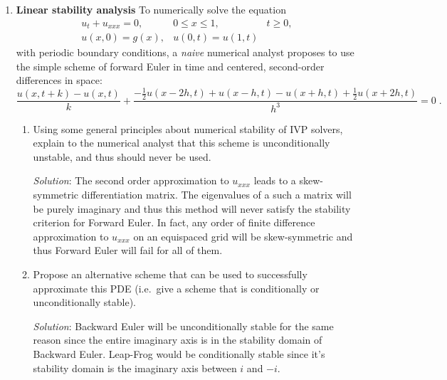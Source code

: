 \documentclass[final,oneside,onecolumn]{article}
\begin{document}
\begin{enumerate}
\item \textbf{Linear stability analysis} To numerically solve
the equation
\begin{equation*}
\begin{array}{lll}
u_t + u_{xxx} = 0, & 0 \leq x \leq 1, & t \geq 0, \\
u(x,0) = g(x), & u(0,t) = u(1,t) &
\end{array}
\end{equation*}
with periodic boundary conditions, a \emph{naive} numerical analyst proposes to use
the simple scheme of forward Euler in time and centered, second-order differences
in space:
\begin{equation*}
\dfrac{u(x,t+k) - u(x,t)}{k} + \dfrac{-\frac{1}{2}u(x-2h,t) + u(x-h,t) - u(x+h,t) + \frac{1}{2}u(x+2h,t)}{h^3} = 0\;.
\end{equation*}
\begin{enumerate}
\item Using some general principles about numerical stability of IVP solvers, explain to the numerical analyst that
this scheme is unconditionally unstable, and thus should never be used.

\bigbreak
\textit{Solution}: The second order approximation to $u_{xxx}$ leads to a skew-symmetric differentiation matrix. The eigenvalues of a such a matrix will be purely imaginary and thus this method will never satisfy the stability criterion for Forward Euler. In fact, any order of finite difference approximation to $u_{xxx}$ on an equispaced grid will be skew-symmetric and thus Forward Euler will fail for all of them.

\bigbreak
\item Propose an alternative scheme that can be used to successfully approximate this PDE (i.e.\ give a scheme that is conditionally or unconditionally stable).
\bigbreak

\textit{Solution}: Backward Euler will be unconditionally stable for the same reason since the entire imaginary axis is in the stability domain of Backward Euler. Leap-Frog would be conditionally stable since it's stability domain is the imaginary axis between $i$ and $-i$.

\end{enumerate}

\medskip


\end{enumerate}
\end{document}
